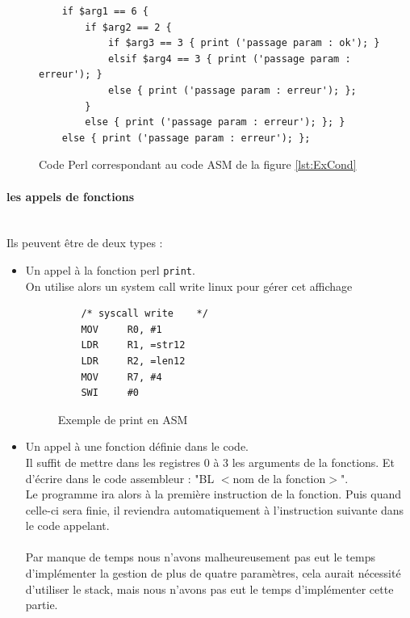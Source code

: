 \documentclass[a4paper,10pt]{article}
\begin{document}
\begin{figure}[H]
\begin{lstlisting}
	if $arg1 == 6 { 
		if $arg2 == 2 {
			if $arg3 == 3 { print ('passage param : ok'); }
			elsif $arg4 == 3 { print ('passage param : erreur'); } 
			else { print ('passage param : erreur'); };
		}
		else { print ('passage param : erreur'); }; }
	else { print ('passage param : erreur'); };
\end{lstlisting}
\fontfamily{}
\caption{Code Perl correspondant au code ASM de la figure \ref{lst:ExCond}}
\label{lst:ExCondSource}
\end{figure}


		\paragraph{les appels de fonctions}~\\
		Ils peuvent être de deux types : \begin{itemize}
			\item Un appel à la fonction perl \verb?print?.\\
				On utilise alors un system call write linux pour gérer cet affichage
\begin{figure}[H]
\begin{lstlisting}
	/* syscall write	*/ 
	MOV 	R0, #1
	LDR 	R1, =str12
	LDR 	R2, =len12
	MOV 	R7, #4
	SWI 	#0
\end{lstlisting}
\fontfamily{}
\caption{Exemple de print en ASM}
\label{lst:ExPrintPerl}
\end{figure}
			
			\item Un appel à une fonction définie dans le code.\\
				Il suffit de mettre dans les registres 0 à 3 les arguments de la fonctions. Et d'écrire dans le code assembleur : "BL $<$nom de la fonction$>$".\\
				Le programme ira alors à la première instruction de la fonction. Puis quand celle-ci sera finie, il reviendra automatiquement à l'instruction suivante dans le code appelant.\\
				~\\
				Par manque de temps nous n'avons malheureusement pas eut le temps d'implémenter la gestion de plus de quatre paramètres, cela aurait nécessité d'utiliser le stack, mais nous n'avons pas eut le temps d'implémenter cette partie.
		\end{itemize}
		
\end{document}
